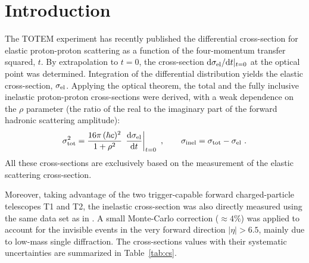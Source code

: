 \documentclass[doublecol]{epl/epl2}
\def\d{{\rm d}}
\begin{document}
\def\FigRatio{%
\begin{figure}
\onefigure{fig/sigma_el_to_sigma_tot.pdf}
\vskip-5mm
\caption{The ratio of the elastic to total cross-section as a function of the scattering energy $\sqrt s$. The dashed line shows the ratio of the $\sigma_{\rm el}(s)$ and $\sigma_{\rm tot}(s)$ fits from Figure~\ref{fig:cs}.
}
\label{fig:sigma rat}
\end{figure}
}

\section{Introduction}

The TOTEM experiment has recently published \cite{epl96,P1} the differential cross-section for elastic proton-proton scattering as a function of the four-momentum transfer squared, $t$. By extrapolation to $t=0$, the cross-section $\d\sigma_{\rm el}/\d t|_{t=0}$ at the optical point was determined. Integration of the differential distribution yields the elastic cross-section, $\sigma_{\rm el}$. Applying the optical theorem, the total and the fully inclusive inelastic proton-proton cross-sections were derived, with a weak dependence on the $\rho$ parameter (the ratio of the real to the imaginary part of the forward hadronic scattering amplitude):
\begin{equation}
\label{eq:m el}
	\sigma_{\rm tot}^2 = {16\pi\, (\hbar c)^2\over 1 + \rho^2}\, \left. \d\sigma_{\rm el}\over\d t\right|_{t=0}\ ,\qquad
	\sigma_{\rm inel} = \sigma_{\rm tot} - \sigma_{\rm el}\ .
\end{equation}
All these cross-sections are exclusively based on the measurement of the elastic scattering cross-section.

Moreover, taking advantage of the two trigger-capable forward charged-particle telescopes T1 and T2, the inelastic cross-section was also directly measured \cite{P2} using the same data set as in \cite{P1}. A small Monte-Carlo correction ($\approx 4\%$) was applied to account for the invisible events in the very forward direction $|\eta| > 6.5$, mainly due to low-mass single diffraction. The cross-sections values with their systematic uncertainties are summarized in Table~\ref{tab:cs}.
\end{document}

